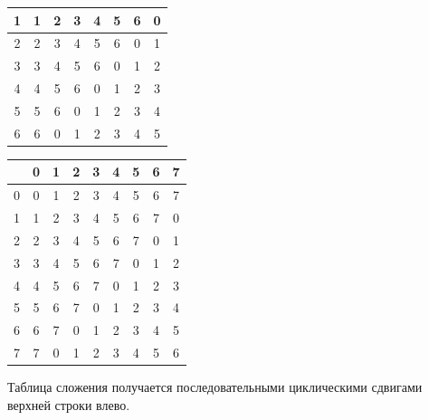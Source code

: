 \begin{enumerate}
\begin{center}
\begin{tabular}{c||c|c|c|c|c|c|c|}
1 & 1 & 2 & 3 & 4 & 5 & 6 & 0 \\ \hline
2 & 2 & 3 & 4 & 5 & 6 & 0 & 1 \\ \hline
3 & 3 & 4 & 5 & 6 & 0 & 1 & 2 \\ \hline
4 & 4 & 5 & 6 & 0 & 1 & 2 & 3 \\ \hline
5 & 5 & 6 & 0 & 1 & 2 & 3 & 4 \\ \hline
6 & 6 & 0 & 1 & 2 & 3 & 4 & 5 \\ \hline
\end{tabular}
\quad
\begin{tabular}{c||c|c|c|c|c|c|c|c|}
  & 0 & 1 & 2 & 3 & 4 & 5 & 6 & 7 \\ \hline\hline
0 & 0 & 1 & 2 & 3 & 4 & 5 & 6 & 7 \\ \hline
1 & 1 & 2 & 3 & 4 & 5 & 6 & 7 & 0 \\ \hline
2 & 2 & 3 & 4 & 5 & 6 & 7 & 0 & 1 \\ \hline
3 & 3 & 4 & 5 & 6 & 7 & 0 & 1 & 2 \\ \hline
4 & 4 & 5 & 6 & 7 & 0 & 1 & 2 & 3 \\ \hline
5 & 5 & 6 & 7 & 0 & 1 & 2 & 3 & 4 \\ \hline
6 & 6 & 7 & 0 & 1 & 2 & 3 & 4 & 5 \\ \hline
7 & 7 & 0 & 1 & 2 & 3 & 4 & 5 & 6 \\ \hline
\end{tabular}
\end{center}
Таблица сложения получается последовательными циклическими сдвигами верхней строки влево.



\end{enumerate}
